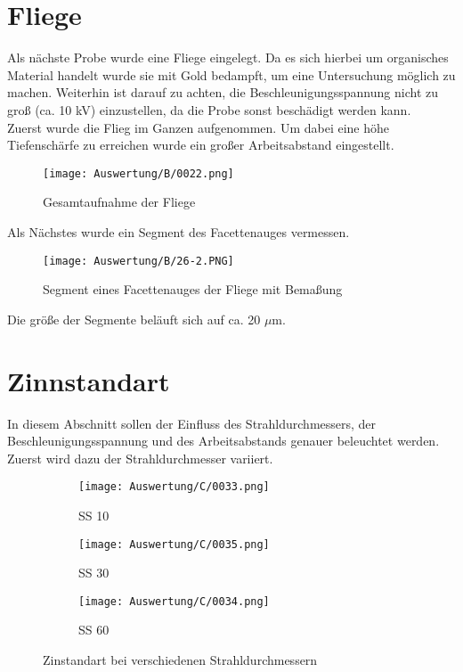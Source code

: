 \newpage
\section{Fliege}

Als nächste Probe wurde eine Fliege eingelegt. Da es sich hierbei um organisches Material handelt wurde sie mit Gold bedampft, um eine Untersuchung möglich zu machen. Weiterhin ist darauf zu achten, die Beschleunigungsspannung nicht zu groß (ca. 10  kV) einzustellen, da die Probe sonst beschädigt werden kann. \\

Zuerst wurde die Flieg im Ganzen aufgenommen. Um dabei eine höhe Tiefenschärfe zu erreichen wurde ein großer Arbeitsabstand eingestellt.
\begin{figure}[h]
    \centering
    \texttt{[image: Auswertung/B/0022.png]}
    \caption{Gesamtaufnahme der Fliege}
\end{figure}

\newpage
Als Nächstes wurde ein Segment des Facettenauges vermessen.
\begin{figure}[h]
    \centering
    \texttt{[image: Auswertung/B/26-2.PNG]}
    \caption{Segment eines Facettenauges der Fliege mit Bemaßung}
\end{figure}

Die größe der Segmente beläuft sich auf ca. 20 $\mu$m.

\newpage
\section{Zinnstandart}
In diesem Abschnitt sollen der Einfluss des Strahldurchmessers, der Beschleunigungsspannung und des Arbeitsabstands genauer beleuchtet werden. \\

Zuerst wird dazu der Strahldurchmesser variiert.
\begin{figure}[h]
    \centering
    \begin{subfigure}[b]{0.25\textwidth}
        \centering
        \texttt{[image: Auswertung/C/0033.png]}
        \caption{SS 10}
    \end{subfigure}
    \hfill
    \begin{subfigure}[b]{0.25\textwidth}
        \centering
        \texttt{[image: Auswertung/C/0035.png]}
        \caption{SS 30}
    \end{subfigure}
    \hfill
    \begin{subfigure}[b]{0.25\textwidth}
        \centering
        \texttt{[image: Auswertung/C/0034.png]}
        \caption{SS 60}
    \end{subfigure}
    \caption{Zinstandart bei verschiedenen Strahldurchmessern}
\end{figure}

